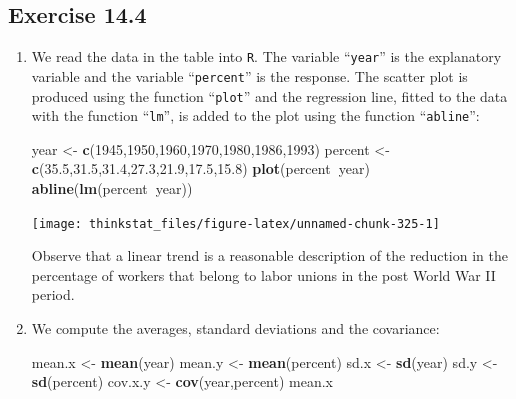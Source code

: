 \documentclass[]{krantz}
\makeatletter
\newenvironment{Shaded}{\begin{snugshade}}{\end{snugshade}}
\newcommand{\KeywordTok}[1]{\textcolor[rgb]{0.13,0.29,0.53}{\textbf{#1}}}
\newcommand{\DecValTok}[1]{\textcolor[rgb]{0.00,0.00,0.81}{#1}}
\newcommand{\FloatTok}[1]{\textcolor[rgb]{0.00,0.00,0.81}{#1}}
\newcommand{\StringTok}[1]{\textcolor[rgb]{0.31,0.60,0.02}{#1}}
\newcommand{\OperatorTok}[1]{\textcolor[rgb]{0.81,0.36,0.00}{\textbf{#1}}}
\newcommand{\NormalTok}[1]{#1}
\newenvironment{kframe}{%
\medskip{}
\setlength{\fboxsep}{.8em}
 \def\at@end@of@kframe{}%
 \ifinner\ifhmode%
  \def\at@end@of@kframe{\end{minipage}}%
  \begin{minipage}{\columnwidth}%
 \fi\fi%
 \def\FrameCommand##1{\hskip\@totalleftmargin \hskip-\fboxsep
 \colorbox{shadecolor}{##1}\hskip-\fboxsep
     \hskip-\linewidth \hskip-\@totalleftmargin \hskip\columnwidth}%
 \MakeFramed {\advance\hsize-\width
   \@totalleftmargin\z@ \linewidth\hsize
   \@setminipage}}%
 {\par\unskip\endMakeFramed%
 \at@end@of@kframe}
\renewenvironment{Shaded}{\begin{kframe}}{\end{kframe}}
\theoremstyle{definition}
\theoremstyle{definition}
\theoremstyle{definition}
\theoremstyle{remark}
\makeatother
\begin{document}
\subsection*{Exercise 14.4}\label{exercise-14.4}


\begin{enumerate}
\def\labelenumi{\arabic{enumi}.}
\item
  We read the data in the table into \texttt{R}. The variable
  ``\texttt{year}'' is the explanatory variable and the variable
  ``\texttt{percent}'' is the response. The scatter plot is produced
  using the function ``\texttt{plot}'' and the regression line, fitted
  to the data with the function ``\texttt{lm}'', is added to the plot
  using the function ``\texttt{abline}'':

\begin{Shaded}
\begin{Highlighting}[]
\NormalTok{year <-}\StringTok{ }\KeywordTok{c}\NormalTok{(}\DecValTok{1945}\NormalTok{,}\DecValTok{1950}\NormalTok{,}\DecValTok{1960}\NormalTok{,}\DecValTok{1970}\NormalTok{,}\DecValTok{1980}\NormalTok{,}\DecValTok{1986}\NormalTok{,}\DecValTok{1993}\NormalTok{)}
\NormalTok{percent <-}\StringTok{ }\KeywordTok{c}\NormalTok{(}\FloatTok{35.5}\NormalTok{,}\FloatTok{31.5}\NormalTok{,}\FloatTok{31.4}\NormalTok{,}\FloatTok{27.3}\NormalTok{,}\FloatTok{21.9}\NormalTok{,}\FloatTok{17.5}\NormalTok{,}\FloatTok{15.8}\NormalTok{)}
\KeywordTok{plot}\NormalTok{(percent}\OperatorTok{~}\NormalTok{year)}
\KeywordTok{abline}\NormalTok{(}\KeywordTok{lm}\NormalTok{(percent}\OperatorTok{~}\NormalTok{year))}
\end{Highlighting}
\end{Shaded}

  \begin{center}\texttt{[image: thinkstat\_files/figure-latex/unnamed-chunk-325-1]} \end{center}

  Observe that a linear trend is a reasonable description of the
  reduction in the percentage of workers that belong to labor unions in
  the post World War II period.
\item
  We compute the averages, standard deviations and the covariance:

\begin{Shaded}
\begin{Highlighting}[]
\NormalTok{mean.x <-}\StringTok{ }\KeywordTok{mean}\NormalTok{(year)}
\NormalTok{mean.y <-}\StringTok{ }\KeywordTok{mean}\NormalTok{(percent)}
\NormalTok{sd.x <-}\StringTok{ }\KeywordTok{sd}\NormalTok{(year)}
\NormalTok{sd.y <-}\StringTok{ }\KeywordTok{sd}\NormalTok{(percent)}
\NormalTok{cov.x.y <-}\StringTok{ }\KeywordTok{cov}\NormalTok{(year,percent)}
\NormalTok{mean.x}
\end{Highlighting}
\end{Shaded}


\end{enumerate}
\end{document}
